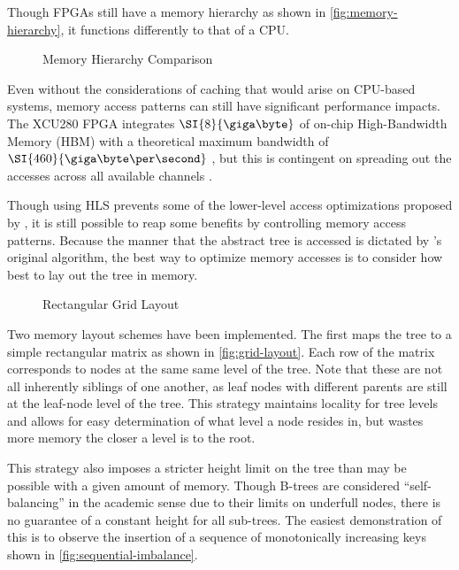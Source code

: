 \label{subsec:memory-layout}

Though FPGAs still have a memory hierarchy as shown in
\autoref{fig:memory-hierarchy}, it functions differently to that of a CPU.

\begin{figure}
	
	\caption{Memory Hierarchy Comparison}
	\label{fig:memory-heirarchy}
\end{figure}

Even without the considerations of caching that would arise on CPU-based
systems, memory access patterns can still have significant performance impacts.
The XCU280 FPGA integrates $\SI{8}{\giga\byte}$ of on-chip High-Bandwidth Memory
(HBM) with a theoretical maximum bandwidth of $\SI{460}{\giga\byte\per\second}$
\autocite{u280}, but this is contingent on spreading out the accesses across all
available channels \autocite{holzinger-ipdpsw-2021}.

Though using HLS prevents some of the lower-level access optimizations proposed
by \citeauthor{holzinger-ipdpsw-2021}, it is still possible to reap some
benefits by controlling memory access patterns. Because the manner that the
abstract tree is accessed is dictated by \citeauthor{b-link}'s original
algorithm, the best way to optimize memory accesses is to consider how best to
lay out the tree in memory.

\begin{figure}
	\centering
	
	\caption{Rectangular Grid Layout}
	\label{fig:grid-layout}
\end{figure}

Two memory layout schemes have been implemented. The first maps the tree to a
simple rectangular matrix as shown in \autoref{fig:grid-layout}. Each row of the
matrix corresponds to nodes at the same same level of the tree. Note that these
are not all inherently siblings of one another, as leaf nodes with different
parents are still at the leaf-node level of the tree. This strategy maintains
locality for tree levels and allows for easy determination of what level a node
resides in, but wastes more memory the closer a level is to the root.

This strategy also imposes a stricter height limit on the tree than may be
possible with a given amount of memory. Though B-trees are considered
``self-balancing'' in the academic sense due to their limits on underfull nodes,
there is no guarantee of a constant height for all sub-trees. The easiest
demonstration of this is to observe the insertion of a sequence of monotonically
increasing keys shown in \autoref{fig:sequential-imbalance}.

